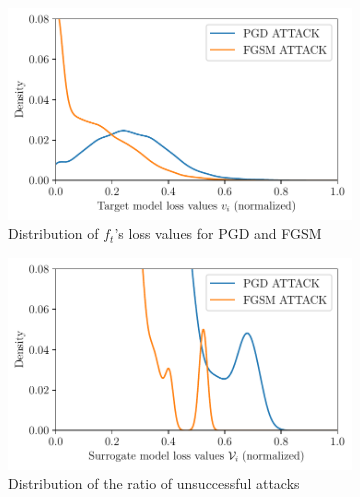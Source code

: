 \begin{figure}[h]
\vspace{-15pt}
    \centering
    \captionsetup[subfigure]{justification=centering}
    \begin{subfigure}[b]{0.32\columnwidth}
    \centering
    \includegraphics[width=\textwidth]{Figures/fgsm_vs_pgd_loss.pdf}
    \caption{\small Distribution of $f_t$'s loss values for PGD and FGSM}
    \label{fig:fgsm_vs_pgd_loss}
    \end{subfigure}
    \hfill
    \begin{subfigure}[b]{0.32\columnwidth}
    \centering
    \includegraphics[width=\textwidth]{Figures/fgsm_vs_pgd_ratio.pdf}
    \caption{\small Distribution of the ratio of unsuccessful attacks}
    \label{fig:fgsm_vs_pgd_ratio}
    \end{subfigure}
    \hfill
    \begin{subfigure}[b]{0.32\columnwidth}
    \centering

\end{subfigure}
\end{figure}
